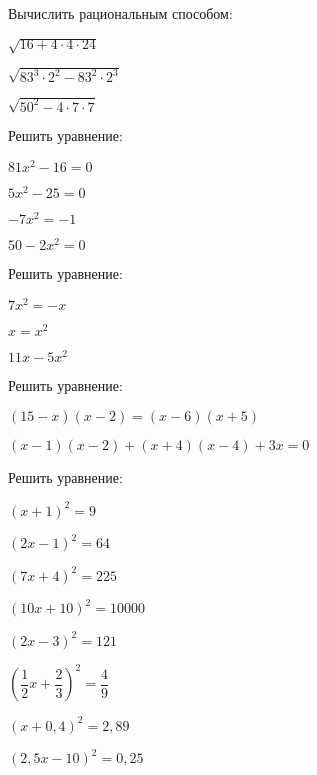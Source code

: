 %
%
%
%
\begin{class}[number=1]
	\begin{listofex}
		\item Вычислить рациональным способом:
		\begin{enumcols}[itemcolumns=3]
			\item \( \sqrt{16+4\cdot4\cdot24} \)
			\item \( \sqrt{83^3\cdot2^2-83^2\cdot2^3} \)
			\item \( \sqrt{50^2-4\cdot7\cdot7} \)
		\end{enumcols}
		\item Решить уравнение:
		\begin{enumcols}[itemcolumns=4]
			\item \( 81x^2-16=0 \)
			\item \( 5x^2-25=0 \)
			\item \( -7x^2=-1 \)
			\item \( 50-2x^2=0 \)
		\end{enumcols}
		\item Решить уравнение:
		\begin{enumcols}[itemcolumns=3]
			\item \( 7x^2=-x \)
			\item \( x=x^2 \)
			\item \( 11x-5x^2 \)
		\end{enumcols}
		\item Решить уравнение:
		\begin{enumcols}[itemcolumns=2]
			\item \( (15-x)(x-2)=(x-6)(x+5) \)
			\item \( (x-1)(x-2)+(x+4)(x-4)+3x=0 \)
		\end{enumcols}
		\item Решить уравнение:
		\begin{enumcols}[itemcolumns=3]
			\item \( (x+1)^2=9 \)
			\item \( (2x-1)^2=64 \)
			\item \( (7x+4)^2=225 \)
			\item \( (10x+10)^2=10000 \)
			\item \( (2x-3)^2=121 \)
			\item \( \left( \dfrac{1}{2}x+\dfrac{2}{3} \right)^2=\dfrac{4}{9} \)
			\item \( (x+0,4)^2=2,89 \)
			\item \( (2,5x-10)^2=0,25 \)

\end{enumcols}
\end{listofex}
\end{class}
